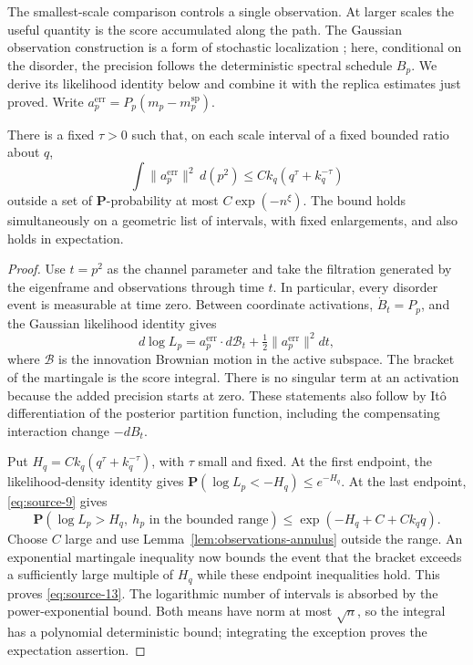 The smallest-scale comparison controls a single observation. At larger
scales the useful quantity is the score accumulated along the path.
The Gaussian observation construction is a form of stochastic localization
\cite{Eldan2013}; here, conditional on the disorder, the precision follows
the deterministic spectral schedule $B_p$. We derive its likelihood identity
below and combine it with the replica estimates just proved. Write
$a_p^{\mathrm{err}}=P_p(m_p-m_p^{\mathrm{sp}})$.

\begin{lemma}\label{lem:observations-score}
There is a fixed $\tau>0$ such that, on each scale interval of a fixed
bounded ratio about $q$,
\begin{equation}\label{eq:source-13}
 \int\|a_p^{\mathrm{err}}\|^2\,d(p^2)
 \le Ck_q(q^\tau+k_q^{-\tau})
\end{equation}
outside a set of $\mathbf P$-probability at most $C\exp(-n^\xi)$.
The bound holds simultaneously on a geometric list of intervals, with
fixed enlargements, and also holds in expectation.
\end{lemma}

\begin{proof}
Use $t=p^2$ as the channel parameter and take the filtration generated by
the eigenframe and observations through time $t$. In particular, every
disorder event is measurable at time zero. Between coordinate activations,
$\dot B_t=P_p$, and the Gaussian likelihood identity gives
\[
 d\log L_p=a_p^{\mathrm{err}}\cdot d\mathcal B_t
       +\tfrac12\|a_p^{\mathrm{err}}\|^2dt,
\]
where $\mathcal B$ is the innovation Brownian motion in the active
subspace. The bracket of the martingale is the score integral. There is
no singular term at an activation because the added precision starts at
zero. These statements also follow by It\^o differentiation of the
posterior partition function, including the compensating interaction
change $-dB_t$.

Put $H_q=Ck_q(q^\tau+k_q^{-\tau})$, with $\tau$ small and fixed.
At the first endpoint, the likelihood-density identity gives
$\mathbf P(\log L_p<-H_q)\le e^{-H_q}$. At the last endpoint,
\eqref{eq:source-9} gives
\[
 \mathbf P(\log L_p>H_q,\ h_p\text{ in the bounded range})
 \le \exp(-H_q+C+Ck_q q).
\]
Choose $C$ large and use Lemma~\ref{lem:observations-annulus} outside
the range. An exponential martingale inequality now bounds the event
that the bracket exceeds a sufficiently large multiple of $H_q$ while
these endpoint inequalities hold. This proves
\eqref{eq:source-13}. The logarithmic number of intervals is absorbed
by the power-exponential bound. Both means have norm at most $\sqrt n$,
so the integral has a polynomial deterministic bound; integrating the
exception proves the expectation assertion.
\end{proof}

